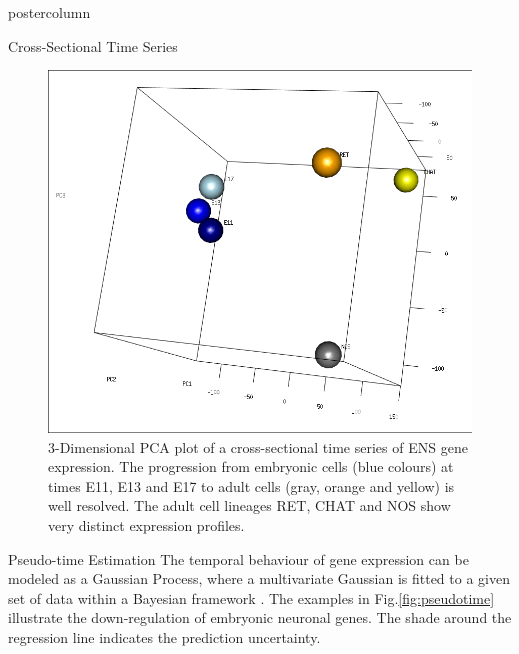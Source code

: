 \documentclass{beamer}
\begin{document}
\begin{frame}
\begin{columns}
\begin{column}{.45\textwidth}
\begin{beamercolorbox}[center]{postercolumn}
\begin{minipage}{.98\textwidth}
{\begin{myblock}{Cross-Sectional Time Series}
\begin{figure}
\begin{minipage}{1.0\textwidth}
	\centering\includegraphics[width=1.0\textwidth]{./time_series}
	\caption{3-Dimensional PCA plot of a cross-sectional time series of ENS
			gene expression. The progression from embryonic cells (blue colours)
			at times E11, E13 and E17 to adult cells (gray, orange and yellow)
			is well resolved. The adult cell lineages RET, CHAT and NOS
			show very distinct expression profiles.}
	\label{fig:timeseries}
\end{minipage}
\end{figure}
\end{myblock}\vfill
\begin{myblock}{Pseudo-time Estimation}
The temporal behaviour of gene expression can be modeled as a Gaussian Process,
where a multivariate Gaussian is fitted to a given set of data
within a Bayesian framework \cite{Reid_2016}. The examples in
Fig.\ref{fig:pseudotime} illustrate the down-regulation of embryonic neuronal
genes. The shade around the regression line indicates the prediction uncertainty.
\begin{figure}
\begin{minipage}{\textwidth}

\end{minipage}
\end{figure}
\end{myblock}}
\end{minipage}
\end{beamercolorbox}
\end{column}
\end{columns}
\end{frame}
\end{document}
